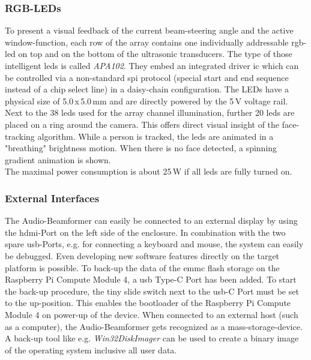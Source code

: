 \subsubsection{RGB-LEDs}
To present a visual feedback of the current beam-steering angle and the active window-function, each row of the array contains one individually addressable \acrshort{rgb}-\acrshort{led} on top and on the bottom of the ultrasonic transducers. The type of those intelligent \acrshort{led}s is called \textit{APA102}. They embed an integrated driver \acrshort{ic} which can be controlled via a non-standard \acrshort{spi} protocol (special start and end sequence instead of a chip select line) in a daisy-chain configuration. The LEDs have a physical size of 5.0\,x\,5.0\,mm and are directly powered by the 5\,V voltage rail.\\
Next to the 38 \acrshort{led}s used for the array channel illumination, further 20 \acrshort{led}s are placed on a ring around the camera. This offers direct visual insight of the face-tracking algorithm. While a person is tracked, the \acrshort{led}s are animated in a "breathing" brightness motion. When there is no face detected, a spinning gradient animation is shown.\\
The maximal power consumption is about 25\,W if all \acrshort{led}s are fully turned on.

\subsubsection{External Interfaces}
The Audio-Beamformer can easily be connected to an external display by using the \acrshort{hdmi}-Port on the left side of the enclosure. In combination with the two spare \acrshort{usb}-Ports, e.g. for connecting a keyboard and mouse, the system can easily be debugged. Even developing new software features directly on the target platform is possible. To back-up the data of the \acrshort{emmc} flash storage on the Raspberry Pi Compute Module 4, a  \acrshort{usb} Type-C Port has been added. To start the back-up procedure, the tiny slide switch next to the \acrshort{usb}-C Port must be set to the up-position. This enables the bootloader of the Raspberry Pi Compute Module 4 on power-up of the device. When connected to an external host (such as a computer), the Audio-Beamformer gets recognized as a mass-storage-device. A back-up tool like e.g. \textit{Win32DiskImager} can be used to create a binary image of the operating system inclusive all user data.

